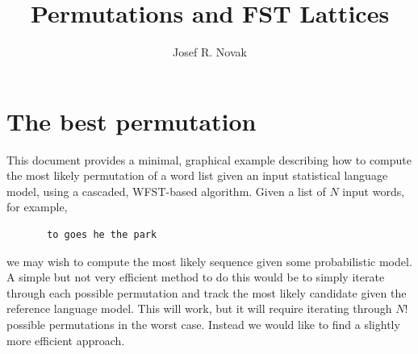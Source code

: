 \documentclass[12pt]{article}
\title{Permutations and FST Lattices}
\author{Josef R. Novak}
\date{}                                           %
\begin{document}
\maketitle

\section{The best permutation}
This document provides a minimal, graphical example describing how to compute the most likely permutation of a word list given an input statistical language model, using a cascaded, WFST-based algorithm.  Given a list of $N$ input words, for example,
\begin{verbatim}
       to goes he the park
\end{verbatim}
\noindent we may wish to compute the most likely sequence given some probabilistic model.  A simple but not very efficient method to do this would be to simply iterate through each possible permutation and track the most likely candidate given the reference language model.  This will work, but it will require iterating through $N!$ possible permutations in the worst case.  Instead we would like to find a slightly more efficient approach.
\end{document}
